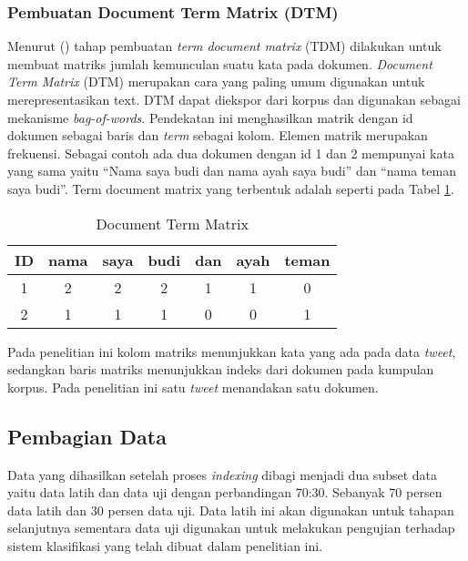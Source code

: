 \subsubsection*{Pembuatan Document Term Matrix (DTM)}

Menurut \citeauthor{nadilah2016} (\cite*{nadilah2016}) tahap pembuatan \textit{term document matrix} (TDM) dilakukan untuk membuat matriks jumlah kemunculan suatu kata pada dokumen. \textit{Document Term Matrix} (DTM) merupakan cara yang paling umum digunakan untuk merepresentasikan text. DTM dapat diekspor dari korpus dan digunakan sebagai mekanisme \textit{bag-of-words}. Pendekatan ini menghasilkan matrik dengan id dokumen sebagai baris dan \textit{term} sebagai kolom. Elemen matrik merupakan frekuensi.
Sebagai contoh ada dua dokumen dengan id 1 dan 2 mempunyai kata yang sama yaitu “Nama saya budi dan nama ayah saya budi” dan “nama teman saya budi”. Term document matrix yang terbentuk adalah seperti pada Tabel \ref{tab:dtm}.

\begin{table}[hbt]
	\caption{Document Term Matrix}
	\centering
	\begin{adjustbox}{max width=\textwidth}
		\begin{tabular}{*{7}{c}}%
			\toprule
			ID & nama & saya & budi & dan & ayah & teman \\
			\midrule
			1 & 2 & 2 & 2 & 1 & 1 & 0 \\
			2 & 1 & 1 & 1 & 0 & 0 & 1 \\
			\bottomrule
		\end{tabular}
	\end{adjustbox}
	\label{tab:dtm}
\end{table}

Pada penelitian ini kolom matriks menunjukkan kata yang ada pada data \textit{tweet}, sedangkan baris matriks menunjukkan indeks dari dokumen pada kumpulan korpus. Pada penelitian ini satu \textit{tweet} menandakan satu dokumen.

\subsection*{Pembagian Data}

Data yang dihasilkan setelah proses \textit{indexing} dibagi menjadi  dua subset data yaitu data latih dan data uji dengan perbandingan 70:30. Sebanyak 70 persen data latih dan 30 persen data uji. Data latih ini akan digunakan untuk tahapan selanjutnya sementara data uji digunakan untuk melakukan pengujian terhadap sistem klasifikasi yang telah dibuat dalam penelitian ini.

